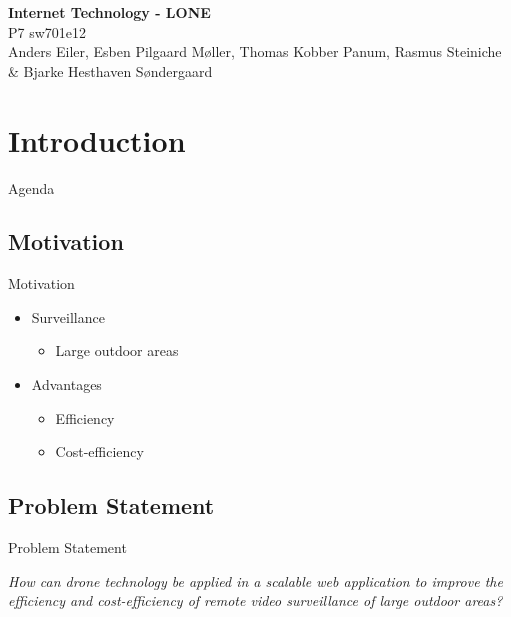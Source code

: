 \author{Rasmus Steiniche}
\begin{frame}{}
	\begin{center}
		\huge \textbf{Internet Technology - LONE}\\
		\normalsize P7 sw701e12\\
		\tiny{Anders Eiler, Esben Pilgaard Møller, Thomas Kobber Panum,}
		\tiny{Rasmus Steiniche \& Bjarke Hesthaven Søndergaard}
	\end{center}
\end{frame}

\section{Introduction}
\begin{frame}{Agenda}{}
\tableofcontents
\end{frame}

\subsection{Motivation}
\begin{frame}{Motivation}
\begin{itemize}
	\item Surveillance
	\begin{itemize}
		\item Large outdoor areas
	\end{itemize}
	\item Advantages
	\begin{itemize}
		\item Efficiency
		\item Cost-efficiency
	\end{itemize}
\end{itemize}
\end{frame}

\subsection{Problem Statement}
\begin{frame}{Problem Statement}
\begin{center}
	\textit{How can drone technology be applied in a scalable web application to improve the efficiency and cost-efficiency of remote video surveillance of large outdoor areas?}
\end{center}
\end{frame}
